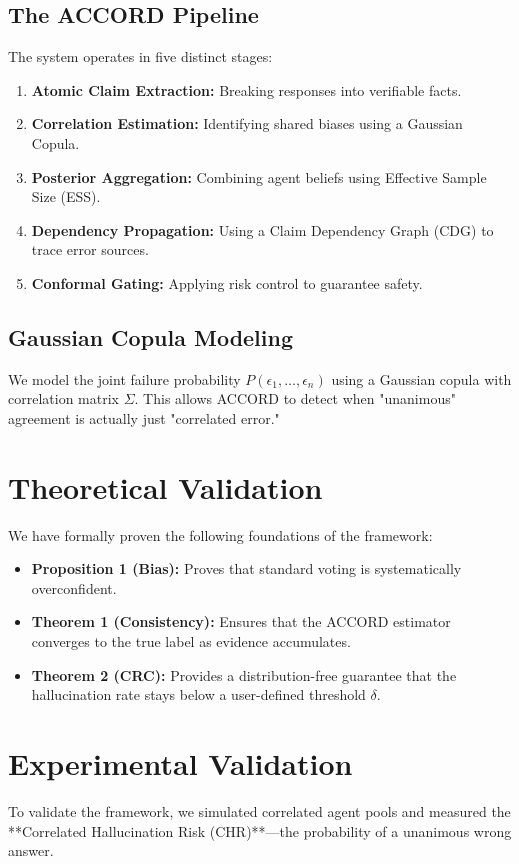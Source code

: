 \documentclass[conference]{IEEEtran}
\begin{document}
\subsection{The ACCORD Pipeline}
The system operates in five distinct stages:
\begin{enumerate}
\item \textbf{Atomic Claim Extraction:} Breaking responses into verifiable facts.
\item \textbf{Correlation Estimation:} Identifying shared biases using a Gaussian Copula.
\item \textbf{Posterior Aggregation:} Combining agent beliefs using Effective Sample Size (ESS).
\item \textbf{Dependency Propagation:} Using a Claim Dependency Graph (CDG) to trace error sources.
\item \textbf{Conformal Gating:} Applying risk control to guarantee safety.
\end{enumerate}

\subsection{Gaussian Copula Modeling}
We model the joint failure probability $P(\epsilon_1, \dots, \epsilon_n)$ using a Gaussian copula with correlation matrix $\Sigma$. This allows ACCORD to detect when "unanimous" agreement is actually just "correlated error."

\section{Theoretical Validation}
We have formally proven the following foundations of the framework:
\begin{itemize}
\item \textbf{Proposition 1 (Bias):} Proves that standard voting is systematically overconfident.
\item \textbf{Theorem 1 (Consistency):} Ensures that the ACCORD estimator converges to the true label as evidence accumulates.
\item \textbf{Theorem 2 (CRC):} Provides a distribution-free guarantee that the hallucination rate stays below a user-defined threshold $\delta$.
\end{itemize}

\section{Experimental Validation}
To validate the framework, we simulated correlated agent pools and measured the **Correlated Hallucination Risk (CHR)**—the probability of a unanimous wrong answer.
\end{document}
